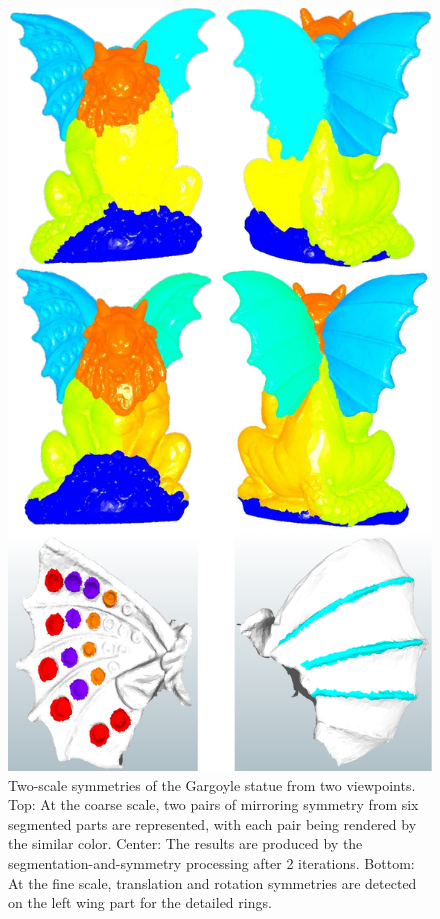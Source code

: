 \begin{figure}[t]
\centering
  \includegraphics[width=0.95\linewidth]{figures/Gargoyl.pdf}
  \caption{Two-scale symmetries of the Gargoyle statue from two viewpoints.
  Top: At the coarse scale, two pairs of mirroring symmetry from six segmented parts are represented, with each pair being rendered by the similar color.
  Center: The results are produced by the segmentation-and-symmetry processing after 2 iterations.
  Bottom: At the fine scale, translation and rotation symmetries are detected on the left wing part for the detailed rings.}
\label{fig:Gargoyl}
\end{figure}

